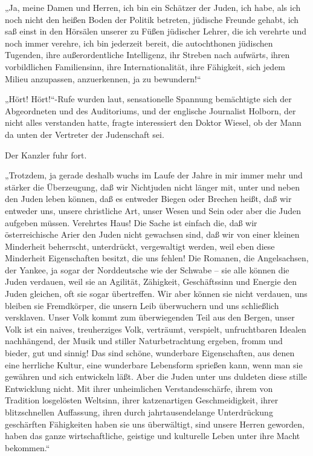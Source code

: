 „Ja, meine Damen und Herren, ich bin ein Schätzer der Juden, ich
habe, als ich noch nicht den heißen Boden der Politik betreten,
jüdische Freunde gehabt, ich saß einst in den Hörsälen unserer
 zu Füßen jüdischer Lehrer, die ich verehrte und
noch immer verehre, ich bin jederzeit bereit, die autochthonen
jüdischen Tugenden, ihre außerordentliche Intelligenz, ihr Streben
nach aufwärts, ihren vorbildlichen Familiensinn, ihre
Internationalität, ihre Fähigkeit, sich jedem Milieu anzupassen,
anzuerkennen, ja zu bewundern!“

„Hört! Hört!“-Rufe wurden laut, sensationelle Spannung bemächtigte
sich der Abgeordneten und des Auditoriums, und der englische
Journalist Holborn, der nicht alles verstanden hatte, fragte
interessiert den Doktor Wiesel, ob der Mann da unten der Vertreter
der Judenschaft sei.

Der Kanzler fuhr fort.

„Trotzdem, ja gerade deshalb wuchs im Laufe der Jahre in mir immer
mehr und stärker die Überzeugung, daß wir Nichtjuden nicht länger
mit, unter und neben den Juden leben können, daß es entweder Biegen
oder  Brechen heißt, daß wir entweder uns, unsere
christliche Art, unser Wesen und Sein oder aber die Juden aufgeben
müssen. Verehrtes Haus! Die Sache ist einfach die, daß wir
österreichische Arier den Juden nicht gewachsen sind, daß wir von
einer kleinen Minderheit beherrscht, unterdrückt, vergewaltigt
werden, weil eben diese Minderheit Eigenschaften besitzt, die uns
fehlen! Die Romanen, die Angelsachsen, der Yankee, ja sogar der
Norddeutsche wie der Schwabe – sie alle können die Juden verdauen,
weil sie an Agilität, Zähigkeit, Geschäftssinn und Energie den
Juden gleichen, oft sie sogar übertreffen. Wir aber können sie
nicht verdauen, uns bleiben sie Fremdkörper, die unsern Leib
überwuchern und uns schließlich versklaven. Unser Volk kommt zum
überwiegenden Teil aus den Bergen, unser Volk ist ein naives,
treuherziges Volk, verträumt, verspielt, unfruchtbaren Idealen
nachhängend, der Musik und stiller Naturbetrachtung ergeben, fromm
und bieder, gut und sinnig! Das sind schöne, wunderbare
Eigenschaften, aus denen eine herrliche Kultur, eine wunderbare
Lebensform sprießen kann, wenn man sie gewähren und sich entwickeln
läßt. Aber die Juden unter uns duldeten diese stille Entwicklung
nicht. Mit ihrer unheimlichen Verstandesschärfe, ihrem von
Tradition losgelösten Weltsinn, ihrer katzenartigen
Geschmeidigkeit, ihrer blitzschnellen Auffassung, ihren durch
jahrtausendelange Unterdrückung geschärften Fähigkeiten haben sie
uns überwältigt, sind unsere Herren geworden, haben das ganze
wirtschaftliche, geistige und kulturelle Leben unter ihre Macht
bekommen.“

